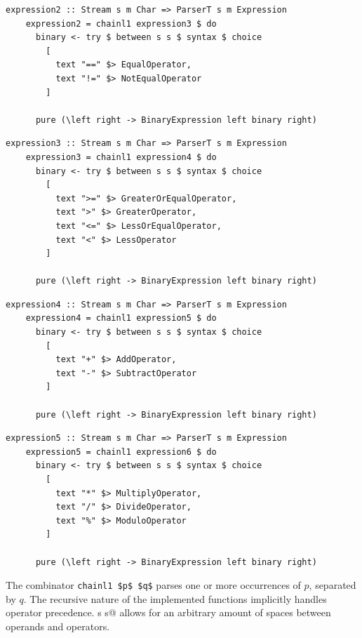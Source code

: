 \documentclass[UdineBachThesis,american,11pt,draft]{PhdThesis}
\begin{document}
  \begin{lstlisting}[gobble=4,basicstyle=\ttfamily\small]
    expression2 :: Stream s m Char => ParserT s m Expression
    expression2 = chainl1 expression3 $ do
      binary <- try $ between s s $ syntax $ choice
        [
          text "==" $> EqualOperator,
          text "!=" $> NotEqualOperator
        ]

      pure (\left right -> BinaryExpression left binary right)
  \end{lstlisting}

  \begin{lstlisting}[gobble=4,basicstyle=\ttfamily\small]
    expression3 :: Stream s m Char => ParserT s m Expression
    expression3 = chainl1 expression4 $ do
      binary <- try $ between s s $ syntax $ choice
        [
          text ">=" $> GreaterOrEqualOperator,
          text ">" $> GreaterOperator,
          text "<=" $> LessOrEqualOperator,
          text "<" $> LessOperator
        ]

      pure (\left right -> BinaryExpression left binary right)
  \end{lstlisting}

  \begin{lstlisting}[gobble=4,basicstyle=\ttfamily\small]
    expression4 :: Stream s m Char => ParserT s m Expression
    expression4 = chainl1 expression5 $ do
      binary <- try $ between s s $ syntax $ choice
        [
          text "+" $> AddOperator,
          text "-" $> SubtractOperator
        ]

      pure (\left right -> BinaryExpression left binary right)
  \end{lstlisting}

  \begin{lstlisting}[gobble=4,basicstyle=\ttfamily\small]
    expression5 :: Stream s m Char => ParserT s m Expression
    expression5 = chainl1 expression6 $ do
      binary <- try $ between s s $ syntax $ choice
        [
          text "*" $> MultiplyOperator,
          text "/" $> DivideOperator,
          text "%" $> ModuloOperator
        ]

      pure (\left right -> BinaryExpression left binary right)
  \end{lstlisting}

  The combinator \lstinline[mathescape]@chainl1 $p$ $q$@ parses one or more
  occurrences of $p$, separated by $q$. The recursive nature of the implemented
  functions implicitly handles operator precedence. \lstinline@between s s@
  allows for an arbitrary amount of spaces between operands and operators.
\end{document}
